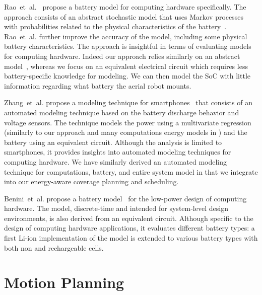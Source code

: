 Rao~et~al.~\citep{rao2005battery} propose a battery model for computing hardware specifically. The approach consists of an abstract stochastic model that uses Markov processes with probabilities related to the physical characteristics of the battery~\citep{panigrahi2001battery}. Rao~et~al. further improve the accuracy of the model, including some physical battery characteristics. The approach is insightful in terms of evaluating models for computing hardware. Indeed our approach relies similarly on an abstract model~\citep{hasan2018exogenous}, whereas we focus on an equivalent electrical circuit which requires less battery-specific knowledge for modeling. We can then model the SoC with little information regarding what battery the aerial robot mounts.

Zhang~et~al. propose a modeling technique for smartphones~\citep{zhang2010accurate} that consists of an automated modeling technique based on the battery discharge behavior and voltage sensors. The technique models the power using a multivariate regression (similarly to our approach and many computations energy models in ) and the battery using an equivalent circuit. Although the analysis is limited to smartphones, it provides insights into automated modeling techniques for computing hardware. We have similarly derived an automated modeling technique for computations, battery, and entire system model in  that we integrate into our energy-aware coverage planning and scheduling.

Benini~et~al. propose a battery model~\citep{benini2001discrete} for the low-power design of computing hardware. The model, discrete-time and intended for system-level design environments, is also derived from an equivalent circuit. Although specific to the design of computing hardware applications, it evaluates different battery types: a first Li-ion implementation of the model is extended to various battery types with both non and rechargeable cells.


\section{Motion Planning}
\label{sec:soa-motion-pl}


